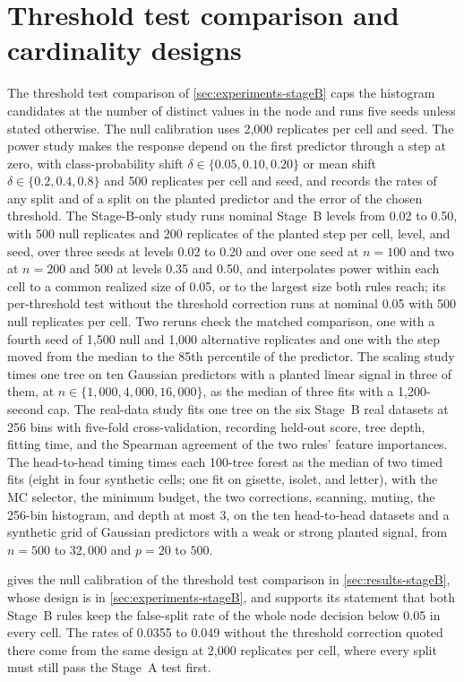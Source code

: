 \section{Threshold test comparison and cardinality designs}
\label{app:stageB-tables}

The threshold test comparison of \cref{sec:experiments-stageB} caps the
histogram candidates at the number of distinct values in the node and runs
five seeds unless stated otherwise. The null calibration uses 2,000 replicates
per cell and seed. The power study makes the response depend on the first
predictor through a step at zero, with class-probability shift
$\delta\in\{0.05,0.10,0.20\}$ or mean shift $\delta\in\{0.2,0.4,0.8\}$ and 500
replicates per cell and seed, and records the rates of any split and of a split
on the planted predictor and the error of the chosen threshold. The
Stage-B-only study runs nominal Stage~B levels from 0.02 to 0.50, with 500 null
replicates and 200 replicates of the planted step per cell, level, and seed,
over three seeds at levels 0.02 to 0.20 and over one seed at $n=100$ and two at
$n=200$ and 500 at levels 0.35 and 0.50, and interpolates power within each cell to a common realized
size of 0.05, or to the largest size both rules reach; its per-threshold test
without the threshold correction runs at nominal 0.05 with 500 null replicates
per cell. Two reruns check the matched comparison, one with a fourth seed of
1,500 null and 1,000 alternative replicates and one with the step moved from the
median to the 85th percentile of the predictor. The scaling study times one
tree on ten Gaussian predictors with a planted linear signal in three of them,
at $n\in\{1{,}000,4{,}000,16{,}000\}$, as the median of three fits with a
1,200-second cap. The real-data study fits one tree on the six Stage~B real
datasets at 256 bins with five-fold cross-validation, recording held-out score,
tree depth, fitting time, and the Spearman agreement of the two rules' feature
importances. The head-to-head timing times each 100-tree forest as the median of two timed
fits (eight in four synthetic cells; one fit on gisette, isolet, and letter), with the
MC selector, the minimum budget, the two corrections, scanning, muting, the
256-bin histogram, and depth at most 3, on the ten head-to-head datasets and a
synthetic grid of Gaussian predictors with a weak or strong planted signal,
from $n=500$ to $32{,}000$ and $p=20$ to $500$.

 gives the null calibration of the threshold test
comparison in \cref{sec:results-stageB}, whose design is in
\cref{sec:experiments-stageB}, and supports its statement that both Stage~B
rules keep the false-split rate of the whole node decision below 0.05 in every
cell. The rates of 0.0355 to 0.049 without the threshold correction quoted
there come from the same design at 2,000 replicates per cell, where every split
must still pass the Stage~A test first.

